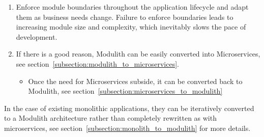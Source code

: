 \begin{enumerate}
    \item Enforce module boundaries throughout the application lifecycle and adapt them as business needs change. Failure to enforce boundaries leads to increasing module size and complexity, which inevitably slows the pace of development.
    \item If there is a good reason, Modulith can be easily converted into Microservices, see section~\ref{subsection:modulith_to_microservices}.
    \begin{itemize}
        \item Once the need for Microservices subside, it can be converted back to Modulith, see section~\ref{subsection:microservices_to_modulith}
    \end{itemize}
\end{enumerate}

\begin{note}
    In the case of existing monolithic applications, they can be iteratively converted to a Modulith architecture rather than completely rewritten as with microservices, see section~\ref{subsection:monolith_to_modulith} for more details.
\end{note}


